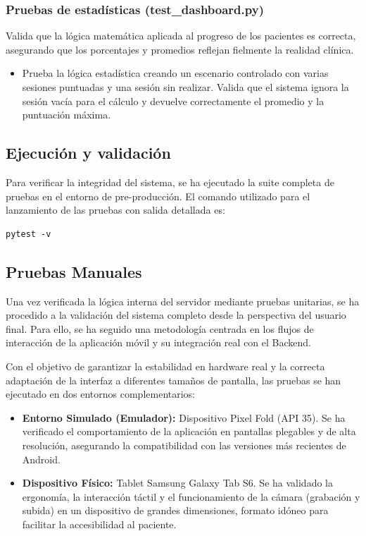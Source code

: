 \subsubsection{Pruebas de estadísticas (test\_dashboard.py)}
Valida que la lógica matemática aplicada al progreso de los pacientes es correcta, asegurando que los porcentajes y promedios reflejan fielmente la realidad clínica.

\begin{itemize}
    \item Prueba la lógica estadística creando un escenario controlado con varias sesiones puntuadas y una sesión sin realizar. Valida que el sistema ignora la sesión vacía para el cálculo y devuelve correctamente el promedio y la puntuación máxima.
\end{itemize}

\subsection{Ejecución y validación}
Para verificar la integridad del sistema, se ha ejecutado la suite completa de pruebas en el entorno de pre-producción. El comando utilizado para el lanzamiento de las pruebas con salida detallada es:

\begin{verbatim}
pytest -v
\end{verbatim}
\subsection{Pruebas Manuales}

Una vez verificada la lógica interna del servidor mediante pruebas unitarias, se ha procedido a la validación del sistema completo desde la perspectiva del usuario final. Para ello, se ha seguido una metodología centrada en los flujos de interacción de la aplicación móvil y su integración real con el Backend.

Con el objetivo de garantizar la estabilidad en hardware real y la correcta adaptación de la interfaz a diferentes tamaños de pantalla, las pruebas se han ejecutado en dos entornos complementarios:

\begin{itemize}
    \item \textbf{Entorno Simulado (Emulador):} Dispositivo Pixel Fold (API 35). Se ha verificado el comportamiento de la aplicación en pantallas plegables y de alta resolución, asegurando la compatibilidad con las versiones más recientes de Android.
    \item \textbf{Dispositivo Físico:} Tablet Samsung Galaxy Tab S6. Se ha validado la ergonomía, la interacción táctil y el funcionamiento de la cámara (grabación y subida) en un dispositivo de grandes dimensiones, formato idóneo para facilitar la accesibilidad al paciente.
\end{itemize}

